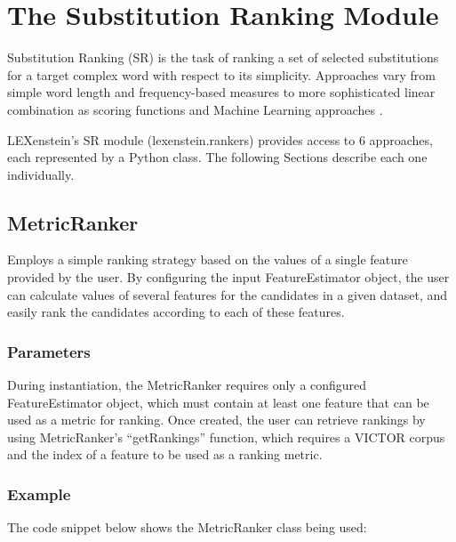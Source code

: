\chapter{The Substitution Ranking Module}
\label{rankers}

Substitution Ranking (SR) is the task of ranking a set of selected substitutions for a target complex word with respect to its simplicity. Approaches vary from simple word length and frequency-based measures \cite{Devlin1998,Carroll98,Carroll99,Biran2011} to more sophisticated linear combination as scoring functions \cite{uowshef} and Machine Learning approaches \cite{Horn2014}.

LEXenstein's SR module (lexenstein.rankers) provides access to $6$ approaches, each represented by a Python class. The following Sections describe each one individually.












\section{MetricRanker}

Employs a simple ranking strategy based on the values of a single feature provided by the user. By configuring the input FeatureEstimator object, the user can calculate values of several features for the candidates in a given dataset, and easily rank the candidates according to each of these features.

\subsection{Parameters}

During instantiation, the MetricRanker requires only a configured FeatureEstimator object, which must contain at least one feature that can be used as a metric for ranking. Once created, the user can retrieve rankings by using MetricRanker's ``getRankings'' function, which requires a VICTOR corpus and the index of a feature to be used as a ranking metric.

\subsection{Example}

The code snippet below shows the MetricRanker class being used:

